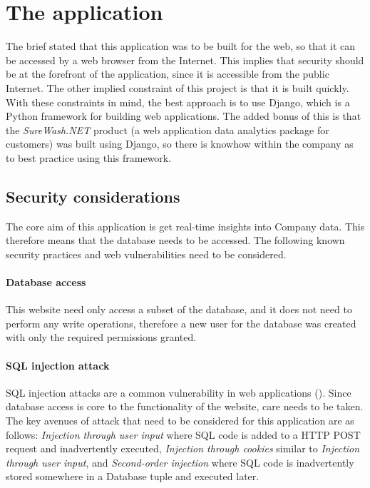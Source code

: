 
\section{The application}
The brief stated that this application was to be built for the web, so that it can be accessed by a web browser from the Internet. This implies that security should be at the forefront of the application, since it is accessible from the public Internet. The other implied constraint of this project is that it is built quickly. With these constraints in mind, the best approach is to use Django, which is a Python framework for building web applications. The added bonus of this is that the {\slshape SureWash.NET} product (a web application data analytics package for customers) was built using Django, so there is knowhow within the company as to best practice using this framework.
    \subsection{Security considerations}
    The core aim of this application is get real-time insights into Company data. This therefore means that the database needs to be accessed. The following known security practices and web vulnerabilities need to be considered.
        \paragraph{Database access} This website need only access a subset of the database, and it does not need to perform any write operations, therefore a new user for the database was created with only the required permissions granted.
        \paragraph{SQL injection attack}
        SQL injection attacks are a common vulnerability in web applications (\cite{halfond2006classification}). Since database access is core to the functionality of the website, care needs to be taken. The key avenues of attack that need to be considered for this application are as follows: {\slshape Injection through user input} where SQL code is added to a HTTP POST request and inadvertently executed, {\slshape Injection through cookies} similar to {\slshape Injection through user input}, and {\slshape Second-order injection} where SQL code is inadvertently stored somewhere in a Database tuple and executed later.

